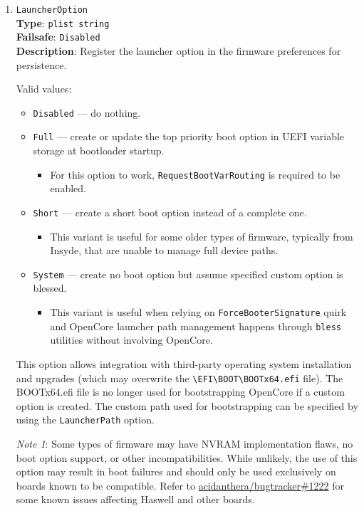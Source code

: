 \documentclass[]{article}
\providecommand{\tightlist}{%
  \setlength{\itemsep}{0pt}\setlength{\parskip}{0pt}}
\begin{document}
\begin{enumerate}
\item
  \texttt{LauncherOption}\\
  \textbf{Type}: \texttt{plist\ string}\\
  \textbf{Failsafe}: \texttt{Disabled}\\
  \textbf{Description}: Register the launcher option in the firmware preferences for persistence.

  Valid values:

  \begin{itemize}
  \tightlist
  \item \texttt{Disabled} --- do nothing.
  \item \texttt{Full} --- create or update the top priority
  boot option in UEFI variable storage at bootloader startup.
  \begin{itemize}
  \tightlist
    \item For this option to work, \texttt{RequestBootVarRouting} is required to be enabled.
  \end{itemize}
  \item \texttt{Short} --- create a short boot option instead of a complete one.
  \begin{itemize}
  \tightlist
    \item This variant is useful for some older types of firmware, typically from Insyde,
    that are unable to manage full device paths.
  \end{itemize}
  \item \texttt{System} --- create no boot option but assume specified custom option is blessed.
    \begin{itemize}
  \tightlist
    \item This variant is useful when relying on \texttt{ForceBooterSignature} quirk and
    OpenCore launcher path management happens through \texttt{bless} utilities without
    involving OpenCore.
  \end{itemize} \medskip
  \end{itemize}

  This option allows integration with third-party operating system installation and upgrades
  (which may overwrite the \texttt{\textbackslash EFI\textbackslash BOOT\textbackslash BOOTx64.efi}
  file). The BOOTx64.efi file is no longer used for bootstrapping OpenCore if a custom option is created.
  The custom path used for bootstrapping can be specified by using the \texttt{LauncherPath} option.

  \emph{Note 1}: Some types of firmware may have NVRAM implementation flaws, no boot option
  support, or other incompatibilities. While unlikely, the use of this option may result in
  boot failures and should only be used exclusively on boards known to be compatible. Refer to
  \href{https://github.com/acidanthera/bugtracker/issues/1222}{acidanthera/bugtracker\#1222}
  for some known issues affecting Haswell and other boards.


\end{enumerate}
\end{document}
